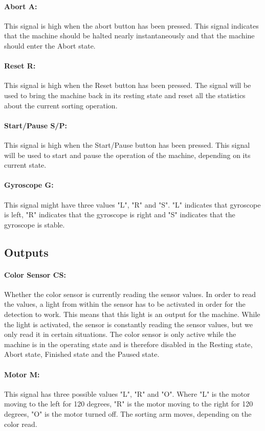\documentclass[a4paper,oneside,11pt]{article}
\begin{document}
\paragraph{Abort A:} This signal is high when the abort button has been pressed. This signal indicates that the machine should be halted nearly instantaneously and that the machine should enter the Abort state.
\paragraph{Reset R:} This signal is high when the Reset button has been pressed. The signal will be used to bring the machine back in its resting state and reset all the statistics about the current sorting operation.
\paragraph{Start/Pause S/P:} This signal is high when the Start/Pause button has been pressed. This signal will be used to start and pause the operation of the machine, depending on its current state.
\paragraph{Gyroscope G:} This signal might have three values "L", "R" and "S". "L" indicates that gyroscope is left, "R" indicates that the gyroscope is right and "S" indicates that the gyroscope is stable.

\subsection{Outputs}
\paragraph{Color Sensor CS:} Whether the color sensor is currently reading the sensor values. In order to read the values, a light from within the sensor has to be activated in order for the detection to work. This means that this light is an output for the machine. While the light is activated, the sensor is constantly reading the sensor values, but we only read it in certain situations. The color sensor is only active while the machine is in the operating state and is therefore disabled in the Resting state, Abort state, Finished state and the Paused state.
\paragraph{Motor M:} This signal has three possible values "L", "R" and "O". Where "L" is the motor moving to the left for 120 degrees, "R" is the motor moving to the right for 120 degrees, "O" is the motor turned off. The sorting arm moves, depending on the color read.
\end{document}
